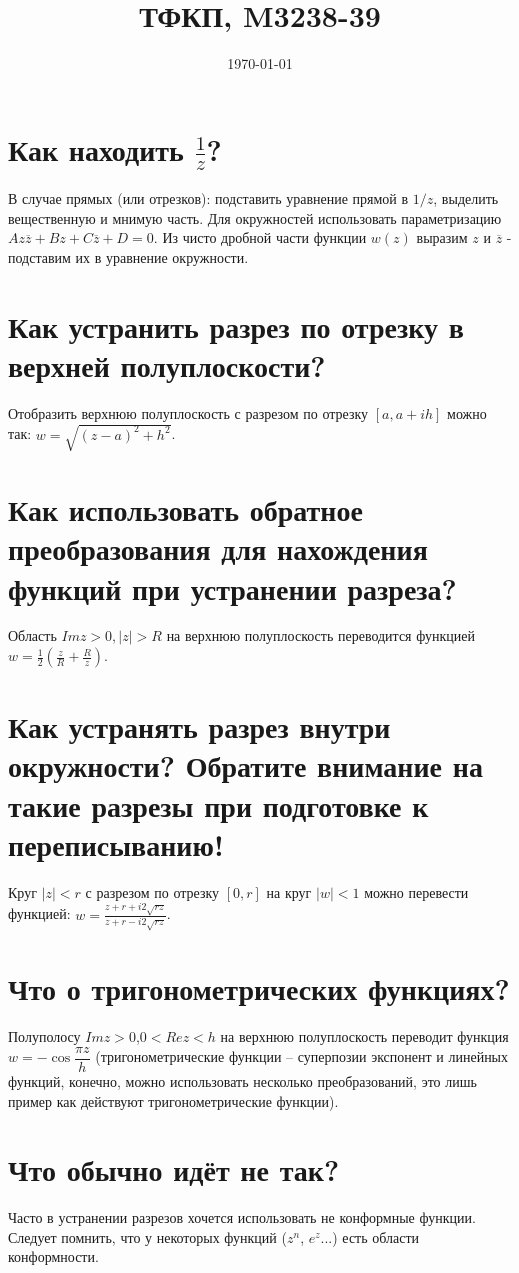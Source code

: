 \documentclass{article}
\title{ТФКП, M3238-39}
\date{\today}
\begin{document}
\maketitle

\section*{Как находить $\frac{1}{z}$?}

В случае прямых (или отрезков): подставить уравнение прямой в $1/z$, выделить вещественную и мнимую часть. Для окружностей использовать параметризацию $Az\overline{z}+Bz+C\overline{z}+D=0$. Из чисто дробной части функции $w(z)$ выразим $z$ и $\overline{z}$ - подставим их в уравнение окружности.

\section*{Как устранить разрез по отрезку в верхней полуплоскости?}

Отобразить верхнюю полуплоскость с разрезом по отрезку $[a, a + ih]$ можно так: $w = \sqrt{(z-a)^2+h^2}$.

\section*{Как использовать обратное преобразования для нахождения функций при устранении разреза?}

Область $Imz>0, \vert z \vert >R$ на верхнюю полуплоскость переводится функцией $w=\frac{1}{2}(\frac{z}{R}+\frac{R}{z})$.

\section*{Как устранять разрез внутри окружности? Обратите внимание на такие разрезы при подготовке к переписыванию!}

Круг $\vert z \vert < r$ с разрезом по отрезку $[0, r]$ на круг $\vert w \vert < 1$ можно перевести функцией: $w=\frac{z + r + i 2\sqrt{rz}}{z + r - i 2\sqrt{rz}}$.

\section*{Что о тригонометрических функциях?}

Полуполосу $Im z > 0$,$ 0 < Re z < h$ на верхнюю полуплоскость переводит функция $w=-\cos \dfrac{\pi z}{h}$ (тригонометрические функции -- суперпозии экспонент и линейных функций, конечно, можно использовать несколько преобразований, это лишь пример как действуют тригонометрические функции).

\section*{Что обычно идёт не так?}

Часто в устранении разрезов хочется использовать не конформные функции. Следует помнить, что у некоторых функций ($z^n$, $e^z$...) есть области конформности.
\end{document}
